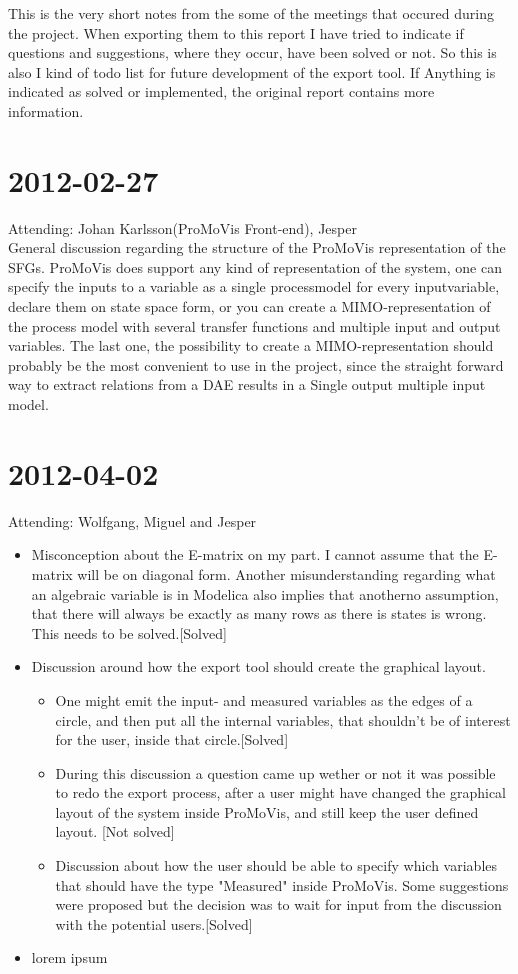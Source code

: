 This is the very short notes from the some of the meetings that occured during the project. When exporting them to this report I have tried to indicate if questions and suggestions, where they occur, have been solved or not. So this is also I kind of todo list for future development of the export tool. If Anything is indicated as solved or implemented, the original report contains more information.

\section{2012-02-27}
Attending: Johan Karlsson(ProMoVis Front-end), Jesper\\\newline General discussion regarding the structure of the ProMoVis representation of the SFGs. ProMoVis does support any kind of representation of the system, one can specify the inputs to a variable as a single processmodel for every inputvariable, declare them on state space form, or you can create a MIMO-representation of the process model with several transfer functions and multiple input and output variables. The last one, the possibility to create a MIMO-representation should probably be the most convenient to use in the project, since the straight forward way to extract relations from a DAE results in a Single output multiple input model.
\section{2012-04-02}
Attending: Wolfgang, Miguel and Jesper\\\newline 
\begin{itemize}
\item Misconception about the E-matrix on my part. I cannot assume that the E-matrix will be on diagonal form. Another misunderstanding regarding what an algebraic variable is in Modelica also implies that anotherno assumption, that there will always be exactly as many rows as there is states is wrong. This needs to be solved.[Solved]
\item Discussion around how the export tool should create the graphical layout. 
\begin{itemize}
\item One might emit the input- and measured variables as the edges of a circle, and then put all the internal variables, that shouldn't be of interest for the user, inside that circle.[Solved]
\item During this discussion a question came up wether or not it was possible to redo the export process, after a user might have changed the graphical layout of the system inside ProMoVis, and still keep the user defined layout. [Not solved]
\item Discussion about how the user should be able to specify which variables that should have the type "Measured" inside ProMoVis. Some suggestions were proposed but the decision was to wait for input from the discussion with the potential users.[Solved]
\end{itemize}
\item lorem ipsum
\end{itemize}

